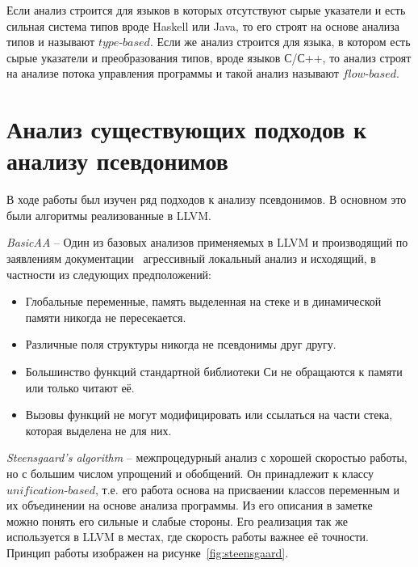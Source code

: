\begin{mydefinition}
Если анализ строится для языков в которых отсутствуют сырые указатели и есть сильная система типов вроде Haskell или Java, то его строят на основе анализа типов и называют $type$-$based$. Если же анализ строится для языка, в котором есть сырые указатели и преобразования типов, вроде языков С/С++, то анализ строят на анализе потока управления программы и такой анализ называют $flow$-$based$.
\end{mydefinition}

\section{Анализ существующих подходов к анализу псевдонимов}

В ходе работы был изучен ряд подходов к анализу псевдонимов. В основном это были алгоритмы реализованные в LLVM. 

\textit{BasicAA} -- Один из базовых анализов применяемых в LLVM и производящий по заявлениям документации~\autocite{LLVMAAI} агрессивный локальный анализ и исходящий, в частности из следующих предположений:
\begin{itemize}
\item Глобальные переменные, память выделенная на стеке и в динамической памяти никогда не пересекается.
\item Различные поля структуры никогда не псевдонимы друг другу.
\item Большинство функций стандартной библиотеки Си не обращаются к памяти или только читают её.
\item Вызовы функций не могут модифицировать или ссылаться на части стека, которая выделена не для них.
\end{itemize}

\textit{Steensgaard’s algorithm} -- межпроцедурный анализ с хорошей скоростью работы, но с большим числом упрощений и обобщений. Он принадлежит к классу $unification$-$based$, т.е. его работа основа на присваении классов переменным и их объединении на основе анализа программы. Из его описания в заметке~\autocite{SteensgaardsNote} можно понять его сильные и слабые стороны. Его реализация так же используется в LLVM в местах, где скорость работы важнее её точности. Принцип работы изображен на рисунке~\ref{fig:steensgaard}.

